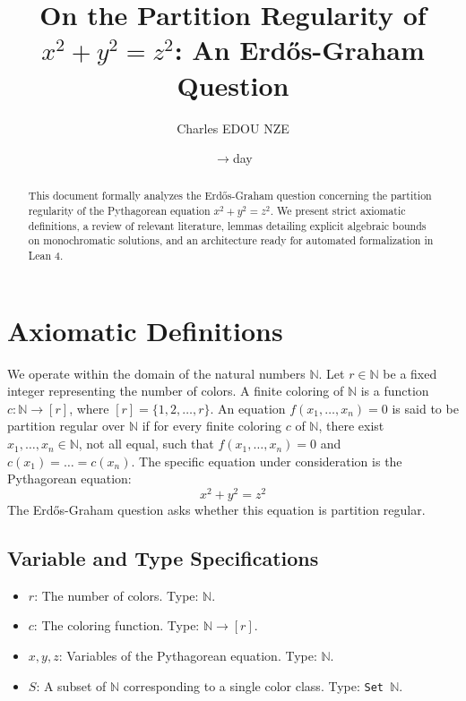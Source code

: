 \documentclass[12pt]{article}
\title{On the Partition Regularity of $x^2+y^2=z^2$: An Erd\H{o}s-Graham Question}
\author{Charles EDOU NZE}
\date{\ensuremath{\to}day}
\begin{document}
\maketitle

\begin{abstract}
This document formally analyzes the Erd\H{o}s-Graham question concerning the partition regularity of the Pythagorean equation $x^2+y^2=z^2$. We present strict axiomatic definitions, a review of relevant literature, lemmas detailing explicit algebraic bounds on monochromatic solutions, and an architecture ready for automated formalization in Lean 4.
\let\thefootnote\relax{}
\end{abstract}

\section{Axiomatic Definitions}
We operate within the domain of the natural numbers $\ensuremath{\mathbb{N}}$. Let $r \in \ensuremath{\mathbb{N}}$ be a fixed integer representing the number of colors.
A finite coloring of $\ensuremath{\mathbb{N}}$ is a function $c: \ensuremath{\mathbb{N}} \ensuremath{\to} [r]$, where $[r] = \{1, 2, \dots, r\}$.
An equation $f(x_1, \dots, x_n) = 0$ is said to be partition regular over $\ensuremath{\mathbb{N}}$ if for every finite coloring $c$ of $\ensuremath{\mathbb{N}}$, there exist $x_1, \dots, x_n \in \ensuremath{\mathbb{N}}$, not all equal, such that $f(x_1, \dots, x_n) = 0$ and $c(x_1) = \dots = c(x_n)$.
The specific equation under consideration is the Pythagorean equation:
\[ x^2 + y^2 = z^2 \]
The Erd\H{o}s-Graham question asks whether this equation is partition regular.

\subsection{Variable and Type Specifications}
\begin{itemize}
    \item $r$: The number of colors. Type: $\ensuremath{\mathbb{N}}$.
    \item $c$: The coloring function. Type: $\ensuremath{\mathbb{N}} \ensuremath{\to} [r]$.
    \item $x, y, z$: Variables of the Pythagorean equation. Type: $\ensuremath{\mathbb{N}}$.
    \item $S$: A subset of $\ensuremath{\mathbb{N}}$ corresponding to a single color class. Type: \texttt{Set $\ensuremath{\mathbb{N}}$}.
\end{itemize}
\end{document}
